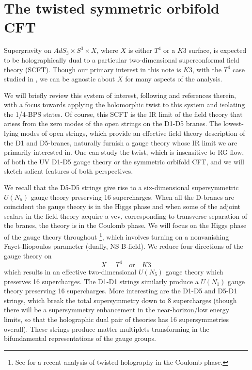 \documentclass[../main.tex]{subfiles}
\begin{document}
\section{The twisted symmetric orbifold CFT}

Supergravity on $AdS_3 \times S^3 \times X$, where $X$ is either $T^4$ or a $K3$ surface, is expected to be holographically dual to a particular two-dimensional superconformal field theory (SCFT). Though our primary interest in this note is $K3$, with the $T^4$ case studied in \cite{CP}, we can be agnostic about $X$ for many aspects of the analysis. 

We will briefly review this system of interest, following \cite{Davidetal} and references therein, with a focus towards applying the holomorphic twist to this system and isolating the 1/4-BPS states. Of course, this SCFT is the IR limit of the field theory that arises from the zero modes of the open strings on the D1-D5 branes. 
The lowest-lying modes of open strings, which provide an effective field theory description of the D1 and D5-branes, naturally furnish a gauge theory whose IR limit we are primarily interested in. One can study the twist, which is insensitive to RG flow, of both the UV D1-D5 gauge theory or the symmetric orbifold CFT, and we will sketch salient features of both perspectives. 

We recall that the D5-D5 strings give rise to a six-dimensional supersymmetric $U(N_5)$ gauge theory preserving 16 supercharges. 
When all the D-branes are coincident the gauge theory is in the Higgs phase and when some of the adjoint scalars in the field theory acquire a vev, corresponding to transverse separation of the branes, the theory is in the Coulomb phase. 
We will focus on the Higgs phase of the gauge theory throughout \footnote{See \cite{Budzik:2022hcd} for a recent analysis of twisted holography in the Coulomb phase.}, which involves turning on a nonvanishing Fayet-Iliopoulos parameter (dually, NS B-field). 
We reduce four directions of the gauge theory on 
\[
X = T^4 \quad \text{or} \quad K3
\]
which results in an effective two-dimensional $U(N_5)$ gauge theory which preserves 16 supercharges.
The D1-D1 strings similarly produce a $U(N_1)$ gauge theory preserving 16 supercharges. 
More interesting are the D1-D5 and D5-D1 strings, which break the total supersymmetry down to 8 supercharges (though there will be a supersymmetry enhancement in the near-horizon/low energy limits, so that the holographic dual pair of theories has 16 supersymmetries overall). 
These strings produce matter multiplets transforming in the bifundamental representations of the gauge groups. 
\end{document}
